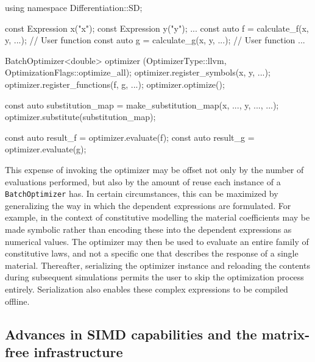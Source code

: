 \documentclass{ansarticle-preprint}
\begin{document}
\begin{c++}
using namespace Differentiation::SD;

const Expression x("x");
const Expression y("y");
...
const auto f = calculate_f(x, y, ...); // User function
const auto g = calculate_g(x, y, ...); // User function
...

BatchOptimizer<double> optimizer (OptimizerType::llvm,
                                  OptimizationFlags::optimize_all);
optimizer.register_symbols(x, y, ...);
optimizer.register_functions(f, g, ...);
optimizer.optimize();

const auto substitution_map
  = make_substitution_map({x, ...}, {y, ...}, ...);
optimizer.substitute(substitution_map);

const auto result_f = optimizer.evaluate(f);
const auto result_g = optimizer.evaluate(g);
\end{c++}

This expense of invoking the optimizer may be offset not only by
the number of evaluations performed, but also by the amount of reuse each
instance of a \texttt{BatchOptimizer} has.
In certain circumstances, this can be maximized by generalizing the way in which
the dependent expressions are formulated.
For example, in the context of constitutive modelling the material coefficients
may be made symbolic rather than encoding these into the dependent expressions
as numerical values.
The optimizer may then be used to evaluate an entire family of constitutive laws,
and not a specific one that describes the response of a single material.
Thereafter, serializing the optimizer instance and reloading the contents during
subsequent simulations permits the user to skip the optimization process entirely.
Serialization also enables these complex expressions to be compiled offline.

\subsection{Advances in SIMD capabilities and the matrix-free infrastructure}
\label{subsec:mf}

\end{document}
